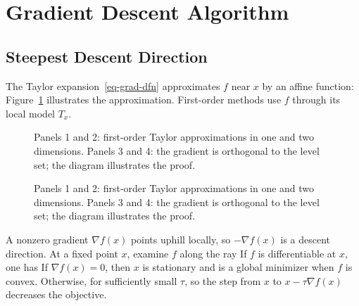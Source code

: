 \section{Gradient Descent Algorithm}
\label{sec-grad-desc-basic}


                                                                                  
\subsection{Steepest Descent Direction}

The Taylor expansion~\eqref{eq-grad-dfn} approximates $f$ near $x$ by an affine function:
Figure~\ref{fig-expansion-taylor} illustrates the approximation. First-order methods use $f$ through its local model $T_x$.


\begin{figure}[tbp]
\centering
{}\hfill
{}
\caption{Panels 1 and 2: first-order Taylor approximations in one and two dimensions.
	Panels 3 and 4: the gradient is orthogonal to the level set; the diagram illustrates the proof.}
\label{fig-expansion-taylor}
\end{figure}
\begin{figure}[tbp]
\BookContinuedFigure
\centering
{}\hfill
{}
\caption{Panels 1 and 2: first-order Taylor approximations in one and two dimensions.
	Panels 3 and 4: the gradient is orthogonal to the level set; the diagram illustrates the proof.}
\label{fig-expansion-taylor-continued}
\end{figure}

A nonzero gradient $\nabla f(x)$ points uphill locally, so $-\nabla f(x)$ is a descent direction. At a fixed point $x$, examine $f$ along the ray
\eq{ 
	\tau \in \RR^+ = [0,+\infty[ \longmapsto f(x-\tau \nabla f(x)) \in \RR.
}
If $f$ is differentiable at $x$, one has 
If $\nabla f(x)=0$, then $x$ is stationary and is a global minimizer when $f$ is convex. Otherwise, for sufficiently small $\tau$,
so the step from $x$ to $x-\tau \nabla f(x)$ decreases the objective.

